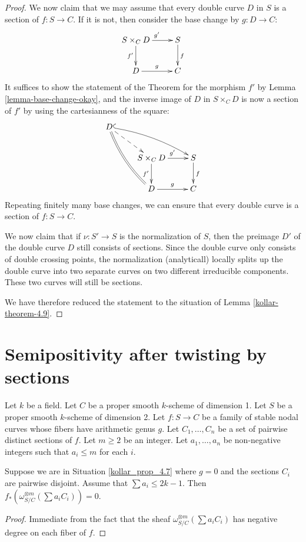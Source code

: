 \begin{proof}
We now claim that we may assume that every double curve $D$ in $S$ is a
section of $f : S \to C$.
If it is not, then consider the base change by $g : D \to C$:
$$
\xymatrix{
S \times_C D \ar[r]^{g'}\ar[d]_{f'} & S \ar[d]^f\\
D \ar[r]^g & C
}
$$
It suffices to show the statement of the Theorem for the morphism $f'$ by Lemma
\ref{lemma-base-change-okay}, and the inverse image of $D$ in $S \times_C D$ is
now a section of $f'$ by using the cartesianness of the square:
$$
\xymatrix{
D\ar@{=}@/_/[ddr]\ar@{^{(}->}@/^/[drr]\ar@{-->}[dr]\\
& S \times_C D \ar[r]^{g'}\ar[d]_{f'} & S \ar[d]^f\\
& D \ar[r]^g & C
}
$$
Repeating finitely many base changes, we can ensure that every double curve is a
section of $f : S \to C$.

We now claim that if $\nu : S' \to S$ is the normalization of $S$, then the
preimage $D'$ of the double curve $D$ still consists of sections.
Since the double curve only consists of double crossing points, the
normalization (analyticall) locally splits up the double curve into two separate
curves on two different irreducible components.
These two curves will still be sections.

We have therefore reduced the statement to the situation of Lemma
\ref{kollar-theorem-4.9}.
\end{proof}






\section{Semipositivity after twisting by sections}

\begin{situation}\label{kollar_prop_4.7}
Let $k$ be a field.
Let $C$ be a proper smooth $k$-scheme of dimension 1.
Let $S$ be a proper smooth $k$-scheme of dimension 2.
Let $f:S\to C$ be a family of stable nodal curves whose fibers have arithmetic genus $g$.
Let $C_1,\ldots,C_n$ be a set of pairwise distinct sections of $f$.
Let $m\ge2$ be an integer.
Let $a_1,\ldots,a_n$ be non-negative integers such that $a_i\le m$ for each $i$.
\end{situation}

\begin{lemma}\label{base_case_genus_0}
Suppose we are in Situation \ref{kollar_prop_4.7} where $g=0$ and the sections $C_i$ are pairwise disjoint.
Assume that $\sum a_i\le 2k-1$.
Then $f_{*}(\omega_{S/C}^{\otimes m}(\sum a_iC_i))=0$.
\end{lemma}
\begin{proof}
Immediate from the fact that the sheaf $\omega_{S/C}^{\otimes m}(\sum a_iC_i)$ has negative degree on each fiber of $f$.
\end{proof}


